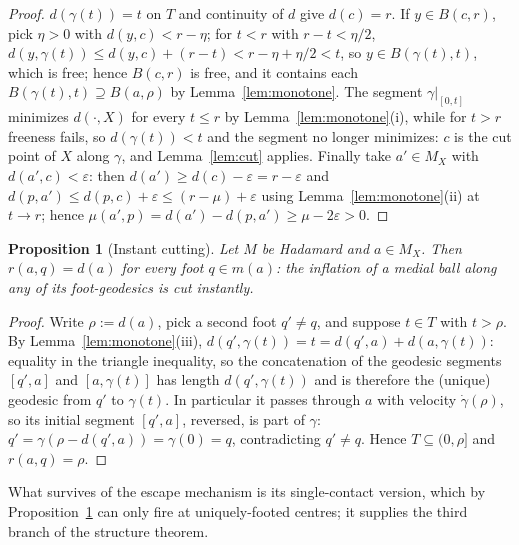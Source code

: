 \documentclass[11pt]{article}
\newtheorem{proposition}[theorem]{Proposition}
\theoremstyle{remark}
\newcommand{\X}{X}
\newcommand{\Mx}{M_{\X}}
\newcommand{\B}{B}
\begin{document}
\begin{proof}
$d(\gamma(t))=t$ on $T$ and continuity of $d$ give $d(c)=r$. If
$y\in\B(c,r)$, pick $\eta>0$ with $d(y,c)<r-\eta$; for $t<r$ with
$r-t<\eta/2$,
$d(y,\gamma(t))\le d(y,c)+(r-t)<r-\eta+\eta/2<t$, so
$y\in\B(\gamma(t),t)$, which is free; hence $\B(c,r)$ is free, and it
contains each $\B(\gamma(t),t)\supseteq\B(a,\rho)$ by
Lemma~\ref{lem:monotone}. The segment $\gamma|_{[0,t]}$ minimizes
$d(\cdot,\X)$ for every $t\le r$ by Lemma~\ref{lem:monotone}(i), while
for $t>r$ freeness fails, so $d(\gamma(t))<t$ and the segment no
longer minimizes: $c$ is the cut point of $\X$ along $\gamma$, and
Lemma~\ref{lem:cut} applies. Finally take $a'\in\Mx$ with
$d(a',c)<\varepsilon$: then $d(a')\ge d(c)-\varepsilon=r-\varepsilon$
and
$d(p,a')\le d(p,c)+\varepsilon\le(r-\mu)+\varepsilon$ using
Lemma~\ref{lem:monotone}(ii) at $t\to r$; hence
$\mu(a',p)=d(a')-d(p,a')\ge\mu-2\varepsilon>0$.
\end{proof}

\begin{proposition}[Instant cutting]\label{prop:rigidity}
Let $M$ be Hadamard and $a\in\Mx$. Then $r(a,q)=d(a)$ for every foot
$q\in m(a)$: the inflation of a medial ball along any of its
foot-geodesics is cut instantly.
\end{proposition}

\begin{proof}
Write $\rho:=d(a)$, pick a second foot $q'\neq q$, and suppose
$t\in T$ with $t>\rho$. By Lemma~\ref{lem:monotone}(iii),
$d(q',\gamma(t))=t=d(q',a)+d(a,\gamma(t))$: equality in the triangle
inequality, so the concatenation of the geodesic segments $[q',a]$
and $[a,\gamma(t)]$ has length $d(q',\gamma(t))$ and is therefore the
(unique) geodesic from $q'$ to $\gamma(t)$. In particular it passes
through $a$ with velocity $\dot\gamma(\rho)$, so its initial segment
$[q',a]$, reversed, is part of $\gamma$:
$q'=\gamma(\rho-d(q',a))=\gamma(0)=q$, contradicting $q'\neq q$.
Hence $T\subseteq(0,\rho]$ and $r(a,q)=\rho$.
\end{proof}

What survives of the escape mechanism is its
single-contact version, which by Proposition~\ref{prop:rigidity} can only
fire at uniquely-footed centres; it supplies the third branch of the
structure theorem.
\end{document}
